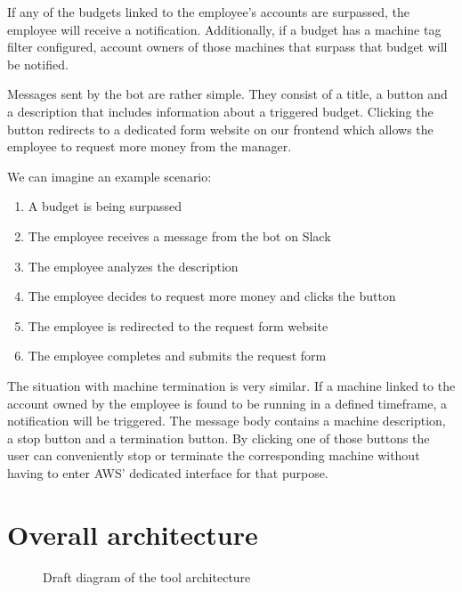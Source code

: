\documentclass[licencjacka,en]{thesisclass}
\begin{document}
    If any of the budgets linked to the employee's accounts are surpassed,
    the employee will receive a notification.
    Additionally, if a budget has a machine tag filter configured,
    account owners of those machines that surpass that budget will be notified.

    Messages sent by the bot are rather simple.
    They consist of a title, a button and a description that includes
    information about a triggered budget.
    Clicking the button redirects to a dedicated form website on our frontend
    which allows the employee to request more money from the manager.

    \bigskip

    We can imagine an example scenario:
    \begin{enumerate}
        \item A budget is being surpassed
        \item The employee receives a message from the bot on Slack
        \item The employee analyzes the description
        \item The employee decides to request more money and clicks the button
        \item The employee is redirected to the request form website
        \item The employee completes and submits the request form
    \end{enumerate}

    \bigskip

    The situation with machine termination is very similar.
    If a machine linked to the account owned by the employee
    is found to be running in a defined timeframe, a notification will be triggered.
    The message body contains a machine description, a stop button and a termination button.
    By clicking one of those buttons the user can conveniently
    stop or terminate the corresponding machine without having
    to enter AWS' dedicated interface for that purpose.


    \section{Overall architecture}

    \begin{figure}[!htbp]
      \caption{Draft diagram of the tool architecture\label{fig:arch-diag}}
    \end{figure}
\end{document}

